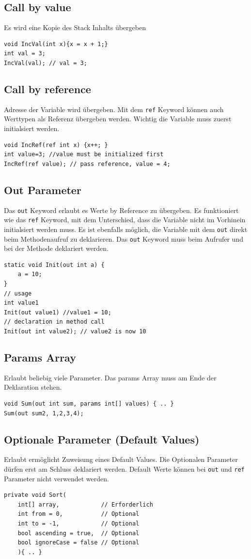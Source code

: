 \documentclass[
a4paper,
oneside,
10pt,
fleqn,
headsepline,
toc=listofnumbered, 
bibliography=totocnumbered]{scrartcl}
\begin{document}
\subsection{Call by value}
Es wird eine Kopie des Stack Inhalts übergeben
\begin{lstlisting}
void IncVal(int x){x = x + 1;}
int val = 3; 
IncVal(val); // val = 3;
\end{lstlisting}

\subsection{Call by reference}
Adresse der Variable wird übergeben. Mit dem \lstinline|ref| Keyword können auch Werttypen als Referenz übergeben werden. Wichtig die Variable muss zuerst initialsiert werden.
\begin{lstlisting}
void IncRef(ref int x) {x++; }
int value=3; //value must be initialized first
IncRef(ref value); // pass reference, value = 4;
\end{lstlisting}

\subsection{Out Parameter}
Das \lstinline|out| Keyword erlaubt es Werte by Reference zu übergeben. Es funktioniert wie das \lstinline|ref| Keyword, mit dem Unterschied, dass die Variable nicht im Vorhinein initialsiert werden muss. Es ist ebenfalls möglich, die Variable mit dem \lstinline|out| direkt beim Methodenaufruf zu deklarieren.
Das \lstinline|out| Keyword muss beim Aufrufer und bei der Methode deklariert werden.
\begin{lstlisting}
static void Init(out int a) {
	a = 10;
}
// usage
int value1 
Init(out value1) //value1 = 10;
// declaration in method call
Init(out int value2); // value2 is now 10 
\end{lstlisting}

\subsection{Params Array}
Erlaubt beliebig viele Parameter. Das params Array muss am Ende der Deklaration stehen.
\begin{lstlisting}
void Sum(out int sum, params int[] values) { .. }
Sum(out sum2, 1,2,3,4);
\end{lstlisting}

\subsection{Optionale Parameter (Default Values)}
Erlaubt ermöglicht Zuweisung eines Default Values. Die Optionalen Parameter dürfen erst am Schluss deklariert werden. Default Werte können bei \lstinline|out| und \lstinline|ref| Parameter nicht verwendet werden.
\begin{lstlisting}
private void Sort(
	int[] array,            // Erforderlich
	int from = 0,           // Optional
	int to = -1,            // Optional
	bool ascending = true,  // Optional
	bool ignoreCase = false // Optional
	){ .. }
\end{lstlisting}
\end{document}

